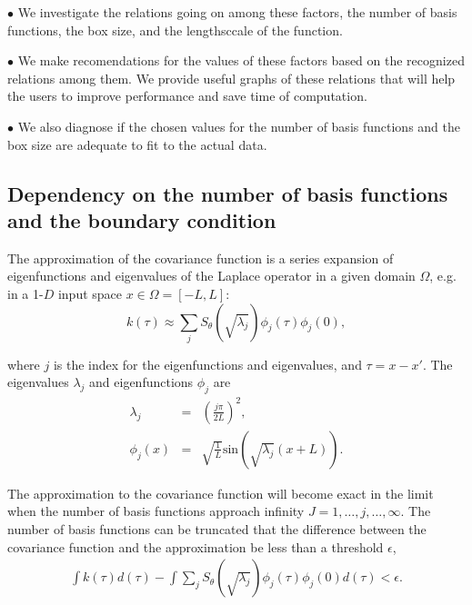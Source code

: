 \documentclass[]{interact}
\theoremstyle{plain}%
\theoremstyle{definition}
\theoremstyle{remark}
\begin{document}
\vspace{2mm}
$\bullet$ We investigate the relations going on among these factors, the number of basis functions, the box size, and the lengthsccale of the function.

\vspace{2mm}
$\bullet$ We make recomendations for the values of these factors based on the recognized relations among them. We provide useful graphs of these relations that will help the users to improve performance and save time of computation.

\vspace{2mm}
$\bullet$ We also diagnose if the chosen values for the number of basis functions and the box size are adequate to fit to the actual data.


\subsection{Dependency on the number of basis functions and the boundary condition}

The approximation of the covariance function is a series expansion of eigenfunctions and eigenvalues of the Laplace operator in a given domain $\Omega$, e.g. in a 1-$D$ input space $x\in \Omega=[-L,L]$:
%
\begin{equation}\label{diffcov}
k(\tau) \approx \sum_{j}S_{\theta}(\sqrt{\lambda_j}) \phi_j(\tau) \phi_j(0),  \nonumber
\end{equation} 

\noindent where $j$ is the index for the eigenfunctions and eigenvalues, and $\tau=x-x'$. The eigenvalues $\lambda_j$ and eigenfunctions $\phi_j$ are 
%
\begin{eqnarray}
\lambda_j&=&\left(\frac{j\pi}{2L}\right)^2, \nonumber \\
\phi_j(x)&=&\sqrt{\frac{1}{L}} \text{sin}\left(\sqrt{\lambda_j}(x+L)\right). \nonumber
\end{eqnarray} 

The approximation to the covariance function will become exact in the limit when the number of basis functions approach infinity $J=1,\dots,j,\dots,\infty$. The number of basis functions can be truncated that the difference between the covariance function and the approximation be less than a threshold $\epsilon$,
%
\begin{eqnarray}\label{diff_covs}
\int k(\tau)d(\tau) - \int \sum_{j}S_{\theta}(\sqrt{\lambda_j}) \phi_j(\tau) \phi_j(0) d(\tau) < \epsilon.
\end{eqnarray}
\end{document}
